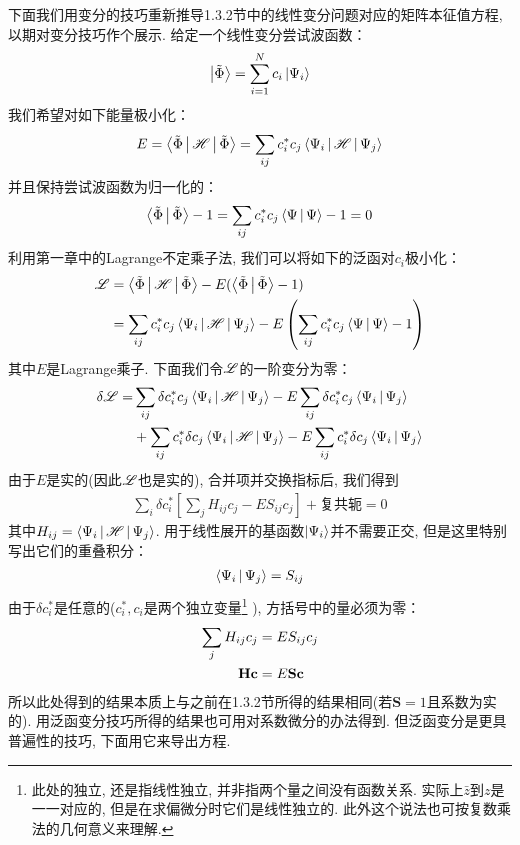 下面我们用变分的技巧重新推导1.3.2节中的线性变分问题对应的矩阵本征值方程, 
以期对变分技巧作个展示. 
给定一个线性变分尝试波函数：
\begin{align}
	\Ket{\tilde{\Phi}} = \sum_{i=1}^{N}c_i\Ket{\Psi_i}
\end{align}
我们希望对如下能量极小化：
\begin{align}
	E = \Braket{\tilde{\Phi}|\mathscr{H}|\tilde{\Phi}} = \sum_{ij} c_i^*c_j\Braket{\Psi_i|\mathscr{H}|\Psi_j}
\end{align}
并且保持尝试波函数为归一化的：
\begin{align}
	\Braket{\tilde{\Phi}|\tilde{\Phi}} - 1 = \sum_{ij}c_i^*c_j \Braket{\Psi|\Psi} - 1 = 0
\end{align}
利用第一章中的Lagrange不定乘子法, 
我们可以将如下的泛函对$c_i$极小化：
\begin{align}
	\mathscr{L} & = \Braket{\tilde{\Phi}|\mathscr{H}|\tilde{\Phi}} - E(\Braket{\tilde{\Phi}|\tilde{\Phi}}-1) \notag\\
	& = \sum_{ij}c_i^*c_j\Braket{\Psi_i|\mathscr{H}|\Psi_j} - E\left( \sum_{ij}c_i^*c_j \Braket{\Psi|\Psi} - 1 \right)
\end{align}
其中$E$是Lagrange乘子. 
下面我们令$\mathscr{L}$的一阶变分为零：
\begin{align}
	\delta\mathscr{L} = & \sum_{ij}\delta c_i^*c_j\Braket{\Psi_i|\mathscr{H}|\Psi_j} - E\sum_{ij}\delta c_i^*c_j\Braket{\Psi_i|\Psi_j} \notag \\
	& +  \sum_{ij}c_i^*\delta c_j\Braket{\Psi_i|\mathscr{H}|\Psi_j} - E\sum_{ij}c_i^*\delta c_j\Braket{\Psi_i|\Psi_j}
\end{align}
由于$E$是实的(因此$\mathscr{L}$也是实的), 
合并项并交换指标后, 
我们得到
\begin{align}
	\sum_i\delta c_i^*\left[ \sum_j H_{ij}c_j - ES_{ij}c_j \right] + \text{复共轭} = 0
\end{align}
其中$H_{ij} = \Braket{\Psi_i|\mathscr{H}|\Psi_j}$. 
用于线性展开的基函数$\Ket{\Psi_i}$并不需要正交, 
但是这里特别写出它们的重叠积分：
\begin{align}
	\Braket{\Psi_i|\Psi_j} = S_{ij}
\end{align}
由于$\delta c_i^*$是任意的($c_i^*,c_i$是两个独立变量\footnote{
	此处的独立, 还是指线性独立, 并非指两个量之间没有函数关系. 
	实际上$\bar{z}$到$z$是一一对应的, 但是在求偏微分时它们是线性独立的. 
	此外这个说法也可按复数乘法的几何意义来理解.}
), 方括号中的量必须为零：
\begin{align}
	\sum_j H_{ij}c_j & = ES_{ij}c_j \notag\\
	\mathbf{Hc} & = E\mathbf{Sc}
\end{align}
所以此处得到的结果本质上与之前在1.3.2节所得的结果相同(若$\mathbf{S}=1$且系数为实的). 
用泛函变分技巧所得的结果也可用对系数微分的办法得到. 
但泛函变分是更具普遍性的技巧, 
下面用它来导出\hft 方程. 


